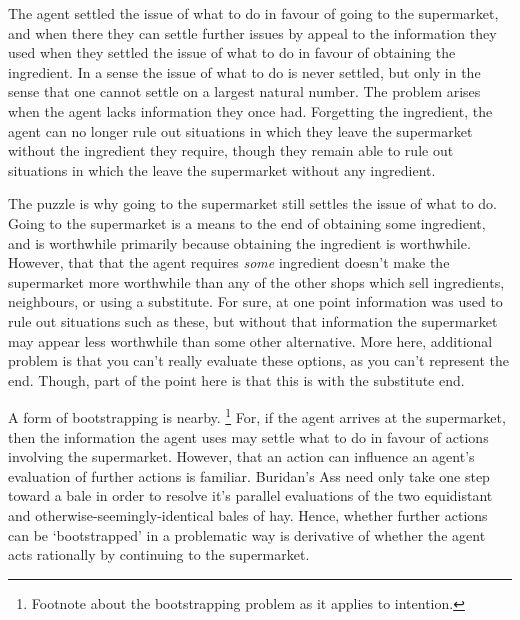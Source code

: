 \documentclass[10pt]{article}
\begin{document}
The agent settled the issue of what to do in favour of going to the supermarket, and when there they can settle further issues by appeal to the information they used when they settled the issue of what to do in favour of obtaining the ingredient.
In a sense the issue of what to do is never settled, but only in the sense that one cannot settle on a largest natural number.
The problem arises when the agent lacks information they once had.
Forgetting the ingredient, the agent can no longer rule out situations in which they leave the supermarket without the ingredient they require, though they remain able to rule out situations in which the leave the supermarket without any ingredient.

The puzzle is why going to the supermarket still settles the issue of what to do.
Going to the supermarket is a means to the end of obtaining some ingredient, and is worthwhile primarily because obtaining the ingredient is worthwhile.
However, that that the agent requires \emph{some} ingredient doesn't make the supermarket more worthwhile than any of the other shops which sell ingredients, neighbours, or using a substitute.
For sure, at one point information was used to rule out situations such as these, but without that information the supermarket may appear less worthwhile than some other alternative.
{\color{red} More here, additional problem is that you can't really evaluate these options, as you can't represent the end.
Though, part of the point here is that this is with the substitute end.}

A form of bootstrapping is nearby.\nolinebreak
\footnote{Footnote about the bootstrapping problem as it applies to intention.}
For, if the agent arrives at the supermarket, then the information the agent uses may settle what to do in favour of actions involving the supermarket.
However, that an action can influence an agent's evaluation of further actions is familiar.
Buridan's Ass need only take one step toward a bale in order to resolve it's parallel evaluations of the two equidistant and otherwise-seemingly-identical bales of hay.
Hence, whether further actions can be `bootstrapped' in a problematic way is derivative of whether the agent acts rationally by continuing to the supermarket.
\end{document}
